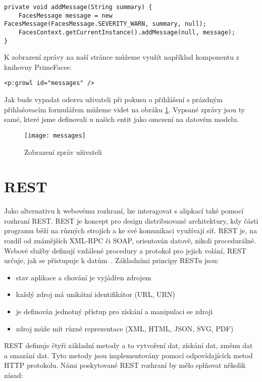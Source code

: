 \documentclass[122pt,oneside]{fithesis}
\begin{document}
\begin{lstlisting}
private void addMessage(String summary) {
	FacesMessage message = new FacesMessage(FacesMessage.SEVERITY_WARN, summary, null);
	FacesContext.getCurrentInstance().addMessage(null, message);
}
\end{lstlisting}

K zobrazení zprávy na naší stránce můžeme využít například komponentu z knihovny PrimeFaces:
\begin{lstlisting}
<p:growl id="messages" />
\end{lstlisting}

Jak bude vypadat odezva uživateli při pokusu o přihlášení s prázdným přihlašovacím formulářem můžeme videt na obráku \ref{fig:messages}. Vypsané zprávy jsou ty samé, které jsme definovali u našich entit jako omezení na datovém modelu.  

\begin{figure}[!ht]
\centering
\texttt{[image: messages]}
\caption{Zobrazení zpráv uživateli}
\label{fig:messages}
\end{figure}

\section{REST}
\label{rest}
Jako alternativu k webovému rozhraní, lze interagovat s alipkací také pomocí rozhraní REST. REST je koncept pro design distribuované architektury, kdy části programu běží na různých strojích a ke své komunikaci využívají síť. REST je, na rozdíl od známějších XML-RPC či SOAP, orientován datově, nikoli procedurálně. Webové služby definují vzdálené procedury a protokol pro jejich volání, REST určuje, jak se přistupuje k datům~\cite{maly09}. Základními principy RESTu jsou:

\begin{itemize}
  \item stav aplikace a chování je vyjádřen zdrojem
  \item každý zdroj má unikátní identifikátor (URL, URN)
  \item je definován jednotný přístup pro získání a manipulaci se zdroji
  \item zdroj může mít různé reprezentace (XML, HTML, JSON, SVG, PDF)
\end{itemize}

REST definuje čtyři základní metody a to vytvoření dat, získání dat, změnu dat a smazání dat. Tyto metody jsou implementovány pomocí odpovídajících metod HTTP protokolu. Námi poskytované REST rozhraní by mělo splňovat několik zásad:
\end{document}
